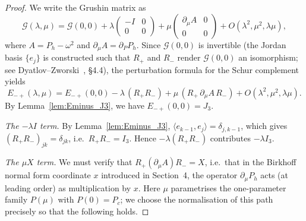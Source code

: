 \documentclass[12pt,a4paper]{amsart}
\theoremstyle{remark}
\begin{document}
\begin{proof}
We write the Grushin matrix as
\[
  \mathcal{G}(\lambda,\mu)
  = \mathcal{G}(0,0)
    + \lambda \begin{pmatrix} -I & 0 \\ 0 & 0 \end{pmatrix}
    + \mu \begin{pmatrix} \partial_\mu A & 0 \\ 0 & 0 \end{pmatrix}
    + O(\lambda^2,\mu^2,\lambda\mu),
\]
where $A = P_h - \omega^2$ and $\partial_\mu A = \partial_P P_h$.
Since $\mathcal{G}(0,0)$ is invertible (the Jordan basis $\{e_j\}$ is constructed
such that $R_+$ and $R_-$ render $\mathcal{G}(0,0)$ an isomorphism;
see Dyatlov--Zworski~\cite{DZ19}, \S4.4), the perturbation formula for the Schur
complement yields
\[
  E_{-+}(\lambda,\mu)
  = E_{-+}(0,0)
    - \lambda\,(R_+ R_-)
    + \mu\,(R_+\,\partial_\mu A\,R_-)
    + O(\lambda^2,\mu^2,\lambda\mu).
\]
By Lemma~\ref{lem:Eminus_J3}, we have $E_{-+}(0,0) = J_3$.

\emph{The $-\lambda I$ term.}
By Lemma~\ref{lem:Eminus_J3}, $\langle e_{k-1}, e_j\rangle = \delta_{j,k-1}$,
which gives $(R_+R_-)_{jk} = \delta_{jk}$, i.e.\ $R_+R_- = I_3$.
Hence $-\lambda(R_+R_-)$ contributes $-\lambda I_3$.

\emph{The $\mu X$ term.}
We must verify that $R_{+}(\partial_{\mu}A)R_{-} = X$, i.e.\ that in the
Birkhoff normal form coordinate $x$ introduced in Section~4, the operator
$\partial_{\mu}P_{h}$ acts (at leading order) as multiplication by $x$.
Here $\mu$ parametrises the one-parameter family $P(\mu)$ with $P(0)=P_{c}$;
we choose the normalisation of this path precisely so that the following holds.


\end{proof}
\end{document}
